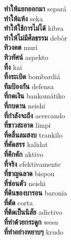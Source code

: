 \textbf{ ทำให้แยกออกมา  } separá \\
\textbf{ ทำให้แห้ง  } seka \\
\textbf{ ทำให้ใช้การไม่ได้  } kibra \\
\textbf{ ทำให้ไม่มีศีลธรรม  } debòr \\
\textbf{ ทิวงคต  } muri \\
\textbf{ ทิวทัศน์  } aspekto \\
\textbf{ ทิ้ง  } kai \\
\textbf{ ทิ้งระเบิด  } bombardiá \\
\textbf{ ทีมป้องกัน  } defensa \\
\textbf{ ที่กดเงิน  } bankomátiko \\
\textbf{ ที่กบดาน  } neishi \\
\textbf{ ที่กำลังจะถึง  } acercando \\
\textbf{ ที่ขาวสะอาด  } limpi \\
\textbf{ ที่คลื่นลมสงบ  } trankilo \\
\textbf{ ที่คัดสรร  } kalidat \\
\textbf{ ที่คึกคัก  } aktivo \\
\textbf{ ที่จริง  } efektivamente \\
\textbf{ ที่ชาญฉลาด  } bispou \\
\textbf{ ที่ซ่อนตัว  } neishi \\
\textbf{ ที่ดินของบารอน  } baronia \\
\textbf{ ที่ตัด  } corta \\
\textbf{ ที่ติดเป็นนิสัย  } adictivo \\
\textbf{ ที่ทำด้วยกระดูก  } wesu \\
\textbf{ ที่ทำอย่างหยาบๆ  } krudo \\
